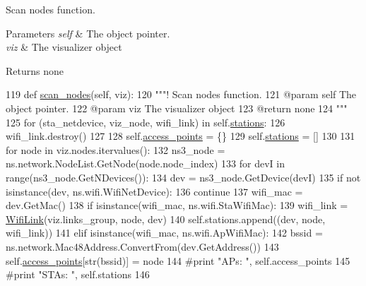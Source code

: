 Scan nodes function. 


\begin{DoxyParams}{Parameters}
{\em self} & The object pointer. \\
\hline
{\em viz} & The visualizer object \\
\hline
\end{DoxyParams}
\begin{DoxyReturn}{Returns}
none 
\end{DoxyReturn}

\begin{DoxyCode}
119     \textcolor{keyword}{def }\hyperlink{classwifi__intrastructure__link_1_1WifiLinkMonitor_a122b520d58f83d1f377f5651c56f0d46}{scan\_nodes}(self, viz):
120         \textcolor{stringliteral}{"""! Scan nodes function.}
121 \textcolor{stringliteral}{        @param self The object pointer.}
122 \textcolor{stringliteral}{        @param viz The visualizer object}
123 \textcolor{stringliteral}{        @return none}
124 \textcolor{stringliteral}{        """}
125         \textcolor{keywordflow}{for} (sta\_netdevice, viz\_node, wifi\_link) \textcolor{keywordflow}{in} self.\hyperlink{classwifi__intrastructure__link_1_1WifiLinkMonitor_ac637392889dae17ecc8f8e5cc31e82e0}{stations}:
126             wifi\_link.destroy()
127 
128         self.\hyperlink{classwifi__intrastructure__link_1_1WifiLinkMonitor_a88bcca8c63ba545b2146e6115974d3a8}{access\_points} = \{\}
129         self.\hyperlink{classwifi__intrastructure__link_1_1WifiLinkMonitor_ac637392889dae17ecc8f8e5cc31e82e0}{stations} = []
130 
131         \textcolor{keywordflow}{for} node \textcolor{keywordflow}{in} viz.nodes.itervalues():
132             ns3\_node = ns.network.NodeList.GetNode(node.node\_index)
133             \textcolor{keywordflow}{for} devI \textcolor{keywordflow}{in} range(ns3\_node.GetNDevices()):
134                 dev = ns3\_node.GetDevice(devI)
135                 \textcolor{keywordflow}{if} \textcolor{keywordflow}{not} isinstance(dev, ns.wifi.WifiNetDevice):
136                     \textcolor{keywordflow}{continue}
137                 wifi\_mac = dev.GetMac()
138                 \textcolor{keywordflow}{if} isinstance(wifi\_mac, ns.wifi.StaWifiMac):
139                     wifi\_link = \hyperlink{classwifi__intrastructure__link_1_1WifiLink}{WifiLink}(viz.links\_group, node, dev)
140                     self.stations.append((dev, node, wifi\_link))
141                 \textcolor{keywordflow}{elif} isinstance(wifi\_mac, ns.wifi.ApWifiMac):
142                     bssid = ns.network.Mac48Address.ConvertFrom(dev.GetAddress())
143                     self.\hyperlink{classwifi__intrastructure__link_1_1WifiLinkMonitor_a88bcca8c63ba545b2146e6115974d3a8}{access\_points}[str(bssid)] = node
144         \textcolor{comment}{#print "APs: ", self.access\_points}
145         \textcolor{comment}{#print "STAs: ", self.stations}
146 
\end{DoxyCode}
